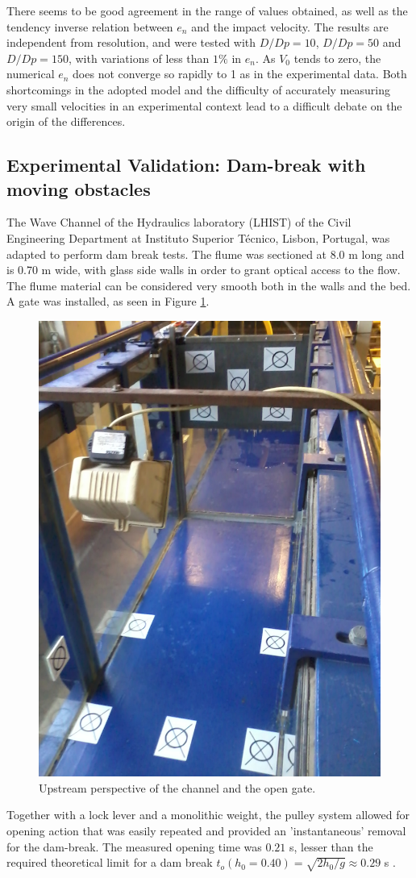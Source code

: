 There seems to be good agreement in the range of values obtained, as well as the tendency inverse relation between $e_n$ and the impact velocity. The results are independent from resolution, and were tested with $D/Dp=10$, $D/Dp=50$ and $D/Dp=150$, with variations of less than $1\%$ in $e_n$. As $V_0$ tends to zero, the numerical $e_n$ does not converge so rapidly to 1 as in the experimental data. Both shortcomings in the adopted model and the difficulty of accurately measuring very small velocities in an experimental context lead to a difficult debate on the origin of the differences.


\subsection{Experimental Validation: Dam-break with moving obstacles}
\label{sec:validation_exp}

The Wave Channel of the Hydraulics laboratory (LHIST) of the Civil Engineering Department at Instituto Superior T\'{e}cnico, Lisbon, Portugal, was adapted to perform dam break tests. The flume was sectioned at 8.0 m long and is 0.70 m wide, with glass side walls in order to grant optical access to the flow. The flume material can be considered very smooth both in the walls and the bed. A gate was installed, as seen in Figure \ref{fig:Gate_channel}.
%
\begin{figure}[ht!]
	\centering
	\includegraphics[width=0.45\linewidth]{Figures/5.Chapter/Gate_channel} 
	\caption{Upstream perspective of the channel and the open gate.}
	\label{fig:Gate_channel} 
\end{figure}
%

Together with a lock lever and a monolithic weight, the pulley system allowed for opening action that was easily repeated and provided an 'instantaneous' removal for the dam-break. The measured opening time was $0.21$ s, lesser than the required theoretical limit for a dam break $t_o(h_0=0.40)=\sqrt{2h_0/g}\approx0.29$ s \citep{Lauber-1998}.

